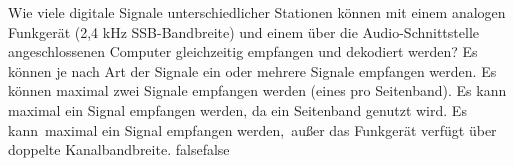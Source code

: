     {Wie viele digitale Signale unterschiedlicher Stationen können mit einem analogen Funkgerät (2,4 kHz SSB-Bandbreite) und einem über die Audio-Schnittstelle angeschlossenen Computer gleichzeitig empfangen und dekodiert werden?}
    {Es können je nach Art der Signale ein oder mehrere Signale empfangen werden.}
    {Es können maximal zwei Signale empfangen werden (eines pro Seitenband).}
    {Es kann maximal ein Signal empfangen werden, da ein Seitenband genutzt wird.}
    {Es kann maximal ein Signal empfangen werden, außer das Funkgerät verfügt über doppelte Kanalbandbreite.}
    {false}{false}